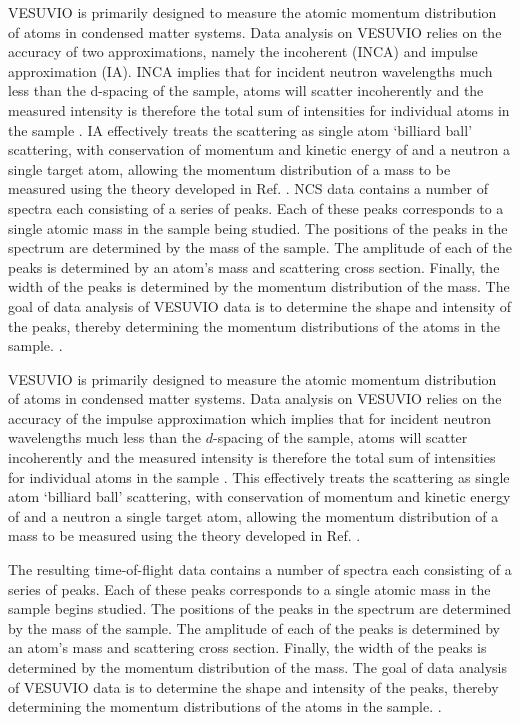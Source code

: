 \documentclass[paper=a4, fontsize=11pt]{scrartcl}	%
\numberwithin{equation}{section}															%
\numberwithin{figure}{section}																%
\numberwithin{table}{section}
\begin{document}
VESUVIO is primarily designed to measure the atomic momentum distribution of atoms in condensed matter systems. Data analysis on VESUVIO relies on the accuracy of two approximations, namely the incoherent (INCA) and impulse approximation (IA). INCA implies that for incident neutron wavelengths much less than the d-spacing of the sample, atoms will scatter incoherently and the measured intensity is
therefore the total sum of intensities for individual atoms in the sample \cite{fernandezalonso2013neutron}. IA effectively treats the scattering as single atom `billiard ball' scattering, with conservation of momentum and kinetic energy of and a neutron a single target atom, allowing the momentum distribution of a mass to be measured using the theory developed in Ref. \cite{mayers2012vesuvio}. NCS data contains a number of spectra each consisting of a series of peaks. Each of these peaks corresponds to a single atomic mass in the sample being studied. The positions of the peaks in the spectrum are determined by the mass of the sample. The amplitude of each of the peaks is determined by an atom's mass and scattering cross section. Finally, the width of the peaks is determined by the momentum distribution of the mass. The goal of data analysis of VESUVIO data is to determine the shape and intensity of the peaks, thereby determining the momentum distributions of the atoms in the sample. \cite{mayers2010user}.

VESUVIO is primarily designed to measure the atomic momentum distribution of atoms in condensed matter systems. Data analysis on VESUVIO relies on the accuracy of the impulse approximation which implies that for incident neutron wavelengths much less than the $d$-spacing of the sample, atoms will scatter incoherently and the measured intensity is therefore the total sum of intensities for individual atoms in the sample \cite{fernandezalonso2013neutron}. This effectively treats the scattering as single atom `billiard ball' scattering, with conservation of momentum and kinetic energy of and a neutron a single target atom, allowing the momentum distribution of a mass to be measured using the theory developed in Ref. \cite{mayers2004vesuvio}.

The resulting time-of-flight data contains a number of spectra each consisting of a series of peaks. Each of these peaks corresponds to a single atomic mass in the sample begins studied. The positions of the peaks in the spectrum are determined by the mass of the sample. The amplitude of each of the peaks is determined by an atom's mass and scattering cross section. Finally, the width of the peaks is determined by the momentum distribution of the mass. The goal of data analysis of VESUVIO data is to determine the shape and intensity of the peaks, thereby determining the momentum distributions of the atoms in the sample. \cite{mayers2010user}.
\end{document}

